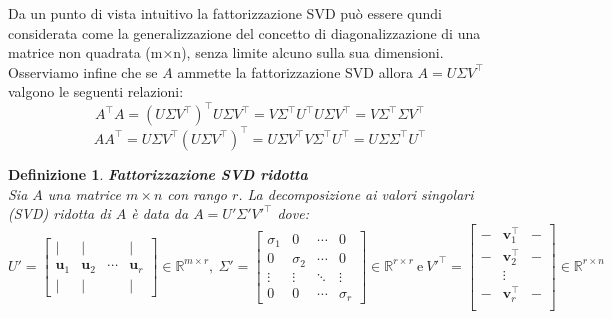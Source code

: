 \documentclass[11pt]{article}
\newtheorem{definition}{Definizione}
\newcommand{\R}{\mathbb{R}}
\begin{document}
Da un punto di vista intuitivo la fattorizzazione SVD può essere qundi considerata come la generalizzazione del concetto di diagonalizzazione di una matrice non quadrata (m×n), senza limite alcuno sulla sua dimensioni.\\
Osserviamo infine che se $A$ ammette la fattorizzazione SVD allora $A=U\Sigma V^\top      $ valgono le seguenti relazioni: $$A^\top      A=(U\Sigma V^\top      )^\top      U\Sigma V^\top      =V\Sigma^\top      U^\top      U\Sigma V^\top      =V\Sigma^\top       \Sigma V^\top      $$
$$ AA^\top      =U\Sigma V^\top      (U\Sigma V^\top      )^\top      =U\Sigma V^\top V \Sigma^\top       U^\top       = U\Sigma \Sigma^\top       U^\top      $$ 
\begin{definition}\label{econ}\textbf{Fattorizzazione SVD ridotta}\\
Sia $A$ una matrice $m \times n$ con rango $r$. La decomposizione ai valori singolari (SVD) ridotta di $A$ è data da $A = U' \Sigma' V'^\top$ dove:
\[
U' = 
\begin{bmatrix}
    | & | & & | \\
    \mathbf{u}_1 & \mathbf{u}_2 & \cdots & \mathbf{u}_r \\
    | & | & & |
\end{bmatrix} \in \R^{m \times r}, \ 
\Sigma' = 
\begin{bmatrix}
    \sigma_1 & 0 & \cdots & 0 \\
    0 & \sigma_2 & \cdots & 0 \\
    \vdots & \vdots & \ddots & \vdots \\
    0 & 0 & \cdots & \sigma_r
\end{bmatrix} \in \R^{r \times r} \ \text{e} \
V'^\top       = 
\begin{bmatrix}
    - & \mathbf{v}_1^\top       & - \\
    - & \mathbf{v}_2^\top       & - \\
    & \vdots & \\
    - & \mathbf{v}_r^\top       & - \\
\end{bmatrix} \in \R^{r \times n}
\]
\end{definition}
\end{document}
